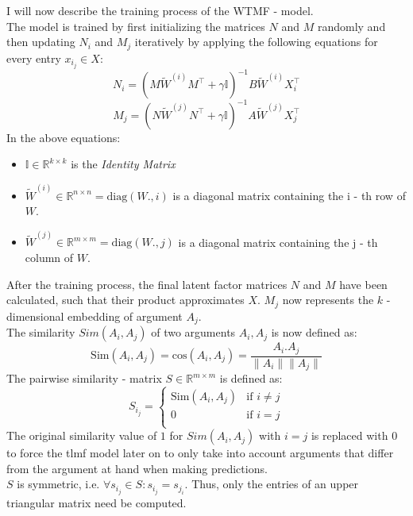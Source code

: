 \noindent I will now describe the training process of the \acrshort{WTMF} - model.\\
The model is trained by first initializing the matrices $N$ and $M$ randomly and then updating $N_i$ and $M_j$ iteratively by applying the following equations for every entry $x_i_j \in X$:
    \begin{equation}
        N_i = (M\tilde{W}^{(i)}M^\top + \gamma\mathbb{I})^{-1}B\tilde{W}^{(i)}X^\top_i
    \end{equation}
    \begin{equation}
        M_j =(N\tilde{W}^{(j)}N^\top + \gamma\mathbb{I})^{-1}A\tilde{W}^{(j)}X^\top_j 
    \end{equation}
In the above equations:
\begin{itemize}
    \item $\mathbb{I} \in \mathbb{R}^{k \times k}$  is the \textit{Identity Matrix}
    \item $\tilde{W}^{(i)} \in \mathbb{R}^{n \times n} = \text{diag}(W.,i)$ is a diagonal matrix containing the i - th row of $W$.
    \item $\tilde{W}^{(j)} \in \mathbb{R}^{m \times m} = \text{diag}(W.,j)$ is a diagonal matrix containing the j - th column of $W$.
\end{itemize}
After the training process, the final latent factor matrices $N$ and $M$ have been calculated, such that their product approximates $X$.
$M_j$ now represents the $k$ - dimensional embedding of argument $A_j$.\\
The similarity $Sim(A_i, A_j)$ of two arguments $A_i, A_j$ is now defined as:
    \begin{equation}
        \text{Sim}(A_i, A_j) = \text{cos}(A_i, A_j) = \frac{A_i.A_j}{\|A_i\|\|A_j\|}
    \end{equation}
The pairwise similarity - matrix $S \in \mathbb{R}^{m \times m}$ is defined as:
    \begin{equation}
        S_i_j = \left\{
	\begin{array}{ll}
		\text{Sim}(A_i, A_j)  & \mbox{if } i \neq j\\
		0 & \mbox{if } i=j \\
	\end{array}
\right.
    \end{equation}
The original similarity value of $1$ for $Sim(A_i, A_j)$ with $i=j$ is replaced with $0$ to force the \acrshort{tlmf} model later on to only take into account arguments that differ from the argument at hand when making predictions.\\
$S$ is symmetric, i.e. $\forall{s_i_j} \in S: s_i_j = s_j_i$. Thus, only the entries of an upper triangular matrix need be computed.

